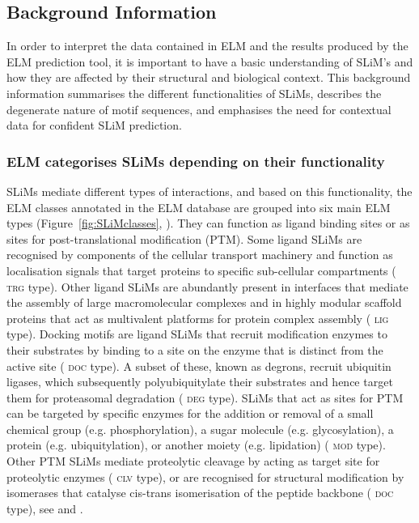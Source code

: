 \documentclass[12pt]{article}
\newcommand\motif[1]{%
    \textsc{\lowercase{#1}}%
}
\begin{document}
	\subsection*{Background Information}\label{background-information}

	In order to interpret the data contained in ELM and the results produced by the
	ELM prediction tool, it is important to have a basic understanding of SLiM's
	and how they are affected by their structural and biological context. This
	background information summarises the different functionalities of SLiMs,
	describes the degenerate nature of motif sequences, and emphasises the need for
	contextual data for confident SLiM prediction.

	\subsubsection*{ELM categorises SLiMs depending on their functionality}

	SLiMs mediate different types of interactions, and based on this functionality,
	the ELM classes annotated in the ELM database are grouped into six main ELM
	types (Figure~\ref{fig:SLiMclasses}, \cite{24214962}). They can function as ligand binding sites or
	as sites for post-translational modification (PTM). Some ligand SLiMs are
	recognised by components of the cellular transport machinery and function as
	localisation signals that target proteins to specific sub-cellular compartments
	(\motif{TRG} type). Other ligand SLiMs are abundantly present in interfaces that mediate
	the assembly of large macromolecular complexes and in highly modular scaffold
	proteins that act as multivalent platforms for protein complex assembly
	(\motif{LIG} type). Docking motifs are ligand SLiMs that recruit modification enzymes to
	their substrates by binding to a site on the enzyme that is distinct from the
	active site (\motif{DOC} type). A subset of these, known as degrons, recruit ubiquitin
	ligases, which subsequently polyubiquitylate their substrates and hence target
	them for proteasomal degradation (\motif{DEG} type). SLiMs that act as sites for PTM can
	be targeted by specific enzymes for the addition or removal of a small chemical
	group (e.g. phosphorylation), a sugar molecule (e.g. glycosylation), a protein
	(e.g. ubiquitylation), or another moiety (e.g. lipidation) (\motif{MOD} type). Other PTM
	SLiMs mediate proteolytic cleavage by acting as target site for proteolytic
	enzymes (\motif{CLV} type), or are recognised for structural modification by isomerases
	that catalyse cis-trans isomerisation of the peptide backbone (\motif{DOC} type), see
	\cite{24926813} and \cite{24773235}.
\end{document}
